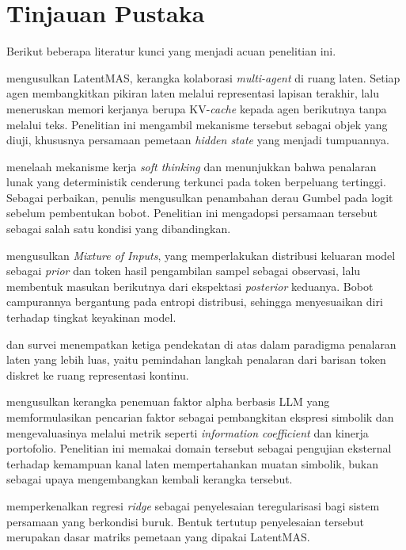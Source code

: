 \section{Tinjauan Pustaka}

Berikut beberapa literatur kunci yang menjadi acuan penelitian ini.

\citet{latentmas} mengusulkan LatentMAS, kerangka kolaborasi
\textit{multi-agent} di ruang laten. Setiap agen membangkitkan pikiran laten
melalui representasi lapisan terakhir, lalu meneruskan memori kerjanya berupa
KV-\textit{cache} kepada agen berikutnya tanpa melalui teks. Penelitian ini
mengambil mekanisme tersebut sebagai objek yang diuji, khususnya persamaan
pemetaan \textit{hidden state} yang menjadi tumpuannya.

\citet{softthinking} menelaah mekanisme kerja \textit{soft thinking} dan
menunjukkan bahwa penalaran lunak yang deterministik cenderung terkunci pada
token berpeluang tertinggi. Sebagai perbaikan, penulis mengusulkan penambahan
derau Gumbel pada logit sebelum pembentukan bobot. Penelitian ini mengadopsi
persamaan tersebut sebagai salah satu kondisi yang dibandingkan.

\citet{moi} mengusulkan \textit{Mixture of Inputs}, yang memperlakukan
distribusi keluaran model sebagai \textit{prior} dan token hasil pengambilan
sampel sebagai observasi, lalu membentuk masukan berikutnya dari ekspektasi
\textit{posterior} keduanya. Bobot campurannya bergantung pada entropi
distribusi, sehingga menyesuaikan diri terhadap tingkat keyakinan model.

\citet{coconut} dan survei \citet{latentsurvey} menempatkan ketiga pendekatan
di atas dalam paradigma penalaran laten yang lebih luas, yaitu pemindahan
langkah penalaran dari barisan token diskret ke ruang representasi kontinu.

\citet{quantaalpha} mengusulkan kerangka penemuan faktor alpha berbasis LLM
yang memformulasikan pencarian faktor sebagai pembangkitan ekspresi simbolik
dan mengevaluasinya melalui metrik seperti \textit{information coefficient} dan
kinerja portofolio. Penelitian ini memakai domain tersebut sebagai pengujian
eksternal terhadap kemampuan kanal laten mempertahankan muatan simbolik, bukan
sebagai upaya mengembangkan kembali kerangka tersebut.

\citet{ridge} memperkenalkan regresi \textit{ridge} sebagai penyelesaian
teregularisasi bagi sistem persamaan yang berkondisi buruk. Bentuk tertutup
penyelesaian tersebut merupakan dasar matriks pemetaan yang dipakai LatentMAS.

